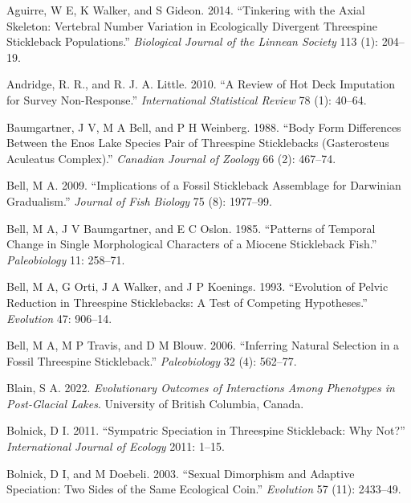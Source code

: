\documentclass[
  12pt,
]{article}
\newlength{\cslhangindent}
\newlength{\cslentryspacingunit} %
\newenvironment{CSLReferences}[2] %
 {%
  \setlength{\parindent}{0pt}
  \ifodd #1
  \let\oldpar\par
  \def\par{\hangindent=\cslhangindent\oldpar}
  \fi
  \setlength{\parskip}{#2\cslentryspacingunit}
 }%
 {}
\begin{document}
\hypertarget{refs}{}
\begin{CSLReferences}{1}{0}
\leavevmode{}%
Aguirre, W E, K Walker, and S Gideon. 2014. {``Tinkering with the Axial
Skeleton: Vertebral Number Variation in Ecologically Divergent
Threespine Stickleback Populations.''} \emph{Biological Journal of the
Linnean Society} 113 (1): 204--19.

\leavevmode{}%
Andridge, R. R., and R. J. A. Little. 2010. {``A Review of Hot Deck
Imputation for Survey Non-Response.''} \emph{International Statistical
Review} 78 (1): 40--64.

\leavevmode{}%
Baumgartner, J V, M A Bell, and P H Weinberg. 1988. {``Body Form
Differences Between the Enos Lake Species Pair of Threespine
Sticklebacks (Gasterosteus Aculeatus Complex).''} \emph{Canadian Journal
of Zoology} 66 (2): 467--74.

\leavevmode{}%
Bell, M A. 2009. {``Implications of a Fossil Stickleback Assemblage for
Darwinian Gradualism.''} \emph{Journal of Fish Biology} 75 (8):
1977--99.

\leavevmode{}%
Bell, M A, J V Baumgartner, and E C Oslon. 1985. {``Patterns of Temporal
Change in Single Morphological Characters of a Miocene Stickleback
Fish.''} \emph{Paleobiology} 11: 258--71.

\leavevmode{}%
Bell, M A, G Orti, J A Walker, and J P Koenings. 1993. {``Evolution of
Pelvic Reduction in Threespine Sticklebacks: A Test of Competing
Hypotheses.''} \emph{Evolution} 47: 906--14.

\leavevmode{}%
Bell, M A, M P Travis, and D M Blouw. 2006. {``Inferring Natural
Selection in a Fossil Threespine Stickleback.''} \emph{Paleobiology} 32
(4): 562--77.

\leavevmode{}%
Blain, S A. 2022. \emph{Evolutionary Outcomes of Interactions Among
Phenotypes in Post-Glacial Lakes}. University of British Columbia,
Canada.

\leavevmode{}%
Bolnick, D I. 2011. {``Sympatric Speciation in Threespine Stickleback:
Why Not?''} \emph{International Journal of Ecology} 2011: 1--15.

\leavevmode{}%
Bolnick, D I, and M Doebeli. 2003. {``Sexual Dimorphism and Adaptive
Speciation: Two Sides of the Same Ecological Coin.''} \emph{Evolution}
57 (11): 2433--49.


\end{CSLReferences}
\end{document}
